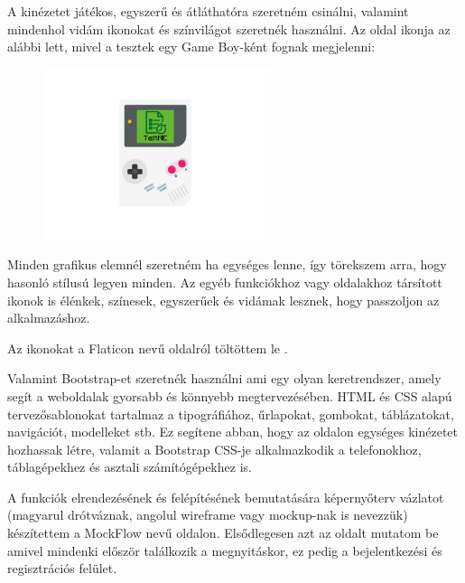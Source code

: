 


A kinézetet játékos, egyszerű és átláthatóra szeretném csinálni, valamint mindenhol vidám ikonokat és színvilágot szeretnék használni. Az oldal ikonja az alábbi lett, mivel a tesztek egy Game Boy-ként fognak megjelenni:

\begin{figure}[h]
    \centering
    \includegraphics[height=5cm]{images/gameboy.png}
\end{figure}


Minden grafikus elemnél szeretném ha egységes lenne, így törekszem arra, hogy hasonló stílusú legyen minden. Az egyéb funkciókhoz vagy oldalakhoz társított ikonok is élénkek, színesek, egyszerűek és vidámak lesznek, hogy passzoljon az alkalmazáshoz. \newline

Az ikonokat a Flaticon nevű oldalról töltöttem le \cite{flaticon}.  \newline

Valamint Bootstrap-et szeretnék használni ami egy olyan keretrendszer, amely segít a weboldalak gyorsabb és könnyebb megtervezésében. HTML és CSS alapú tervezősablonokat tartalmaz a tipográfiához, űrlapokat, gombokat, táblázatokat, navigációt, modelleket stb. Ez segítene abban, hogy az oldalon egységes kinézetet hozhassak létre, valamit a Bootstrap CSS-je alkalmazkodik a telefonokhoz, táblagépekhez és asztali számítógépekhez is.


A funkciók elrendezésének és felépítésének bemutatására képernyőterv vázlatot (magyarul drótváznak, angolul wireframe vagy mockup-nak is nevezzük) készítettem a MockFlow \cite{mockflow} nevű oldalon.
Elsődlegesen azt az oldalt mutatom be amivel mindenki először találkozik a megnyitáskor, ez pedig a bejelentkezési és regisztrációs felület.

